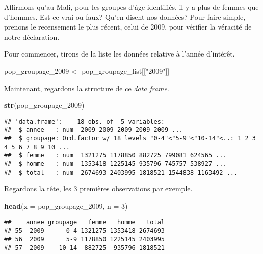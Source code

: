 \documentclass[]{book}
\newenvironment{Shaded}{\begin{snugshade}}{\end{snugshade}}
\newcommand{\KeywordTok}[1]{\textcolor[rgb]{0.13,0.29,0.53}{\textbf{#1}}}
\newcommand{\DataTypeTok}[1]{\textcolor[rgb]{0.13,0.29,0.53}{#1}}
\newcommand{\DecValTok}[1]{\textcolor[rgb]{0.00,0.00,0.81}{#1}}
\newcommand{\StringTok}[1]{\textcolor[rgb]{0.31,0.60,0.02}{#1}}
\newcommand{\NormalTok}[1]{#1}
\begin{document}
Affirmons qu'au Mali, pour les groupes d'âge identifiés, il y a plus de
femmes que d'hommes. Est-ce vrai ou faux? Qu'en disent nos données? Pour
faire simple, prenons le recensement le plus récent, celui de 2009, pour
vérifier la véracité de notre déclaration.

Pour commencer, tirons de la liste les données relative à l'année
d'intérêt.

\begin{Shaded}
\begin{Highlighting}[]
\NormalTok{pop_groupage_}\DecValTok{2009}\NormalTok{ <-}\StringTok{ }\NormalTok{pop_groupage_list[[}\StringTok{"2009"}\NormalTok{]]}
\end{Highlighting}
\end{Shaded}

Maintenant, regardons la structure de ce \emph{data frame}.

\begin{Shaded}
\begin{Highlighting}[]
\KeywordTok{str}\NormalTok{(pop_groupage_}\DecValTok{2009}\NormalTok{)}
\end{Highlighting}
\end{Shaded}

\begin{verbatim}
## 'data.frame':    18 obs. of  5 variables:
##  $ annee   : num  2009 2009 2009 2009 2009 ...
##  $ groupage: Ord.factor w/ 18 levels "0-4"<"5-9"<"10-14"<..: 1 2 3 4 5 6 7 8 9 10 ...
##  $ femme   : num  1321275 1178850 882725 799081 624565 ...
##  $ homme   : num  1353418 1225145 935796 745757 538927 ...
##  $ total   : num  2674693 2403995 1818521 1544838 1163492 ...
\end{verbatim}

Regardons la tête, les 3 premières observations par exemple.

\begin{Shaded}
\begin{Highlighting}[]
\KeywordTok{head}\NormalTok{(}\DataTypeTok{x =}\NormalTok{ pop_groupage_}\DecValTok{2009}\NormalTok{, }\DataTypeTok{n =} \DecValTok{3}\NormalTok{)}
\end{Highlighting}
\end{Shaded}

\begin{verbatim}
##    annee groupage   femme   homme   total
## 55  2009      0-4 1321275 1353418 2674693
## 56  2009      5-9 1178850 1225145 2403995
## 57  2009    10-14  882725  935796 1818521
\end{verbatim}
\end{document}
